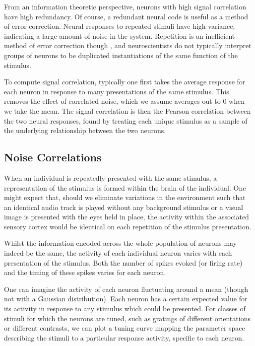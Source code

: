 From an information theoretic perspective, neurons with high signal correlation have high redundancy.
Of course, a redundant neural code is useful as a method of error correction.
Neural responses to repeated stimuli have high-variance, indicating a large amount of noise in the system.
Repetition is an inefficient method of error correction though \citep[Chapter~1]{mackay2003information}, and neuroscientists do not typically interpret groups of neurons to be duplicated instantiations of the same function of the stimulus.

To compute signal correlation, typically one first takes the average response for each neuron in response to many presentations of the same stimulus.
This removes the effect of correlated noise, which we assume averages out to $0$ when we take the mean.
The signal correlation is then the Pearson correlation between the two neural responses, found by treating each unique stimulus as a sample of the underlying relationship between the two neurons.


\subsection{Noise Correlations}
\label{sec:bg-noisecorr}

When an individual is repeatedly presented with the same stimulus, a representation of the stimulus is formed within the brain of the individual.
One might expect that, should we eliminate variations in the environment such that an identical audio track is played without any background stimulus or a visual image is presented with the eyes held in place, the activity within the associated sensory cortex would be identical on each repetition of the stimulus presentation.

Whilst the information encoded across the whole population of neurons may indeed be the same, the activity of each individual neuron varies with each presentation of the stimulus.
Both the number of spikes evoked (or firing rate) and the timing of these spikes varies for each neuron. 

One can imagine the activity of each neuron fluctuating around a mean (though not with a Gaussian distribution).
Each neuron has a certain expected value for its activity in response to any stimulus which could be presented.
For classes of stimuli for which the neurons are tuned, such as gratings of different orientations or different contrasts, we can plot a tuning curve mapping the parameter space describing the stimuli to a particular response activity, specific to each neuron.

